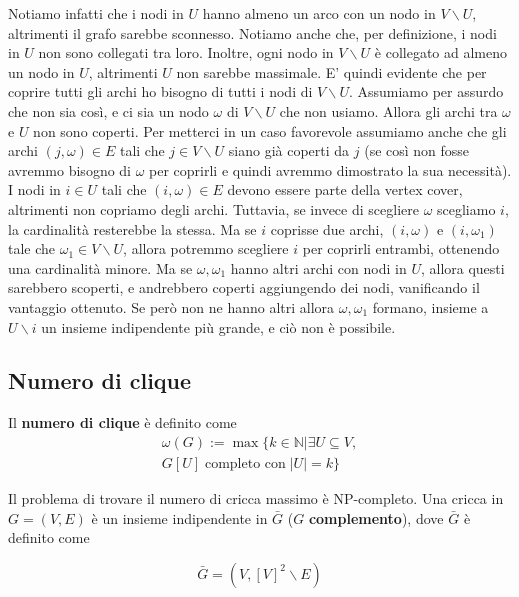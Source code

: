 \documentclass[12pt]{report}
\begin{document}
\noindent 
Notiamo infatti che i nodi in $U$ hanno almeno un arco con un nodo in $V\backslash U$, altrimenti il grafo sarebbe sconnesso. Notiamo anche che, per definizione, i nodi in $U$ non sono collegati tra loro. Inoltre, ogni nodo in $V\backslash U$ è collegato ad almeno un nodo in $U$, altrimenti $U$ non sarebbe massimale. E' quindi evidente che per coprire tutti gli archi ho bisogno  di tutti i nodi di $V\backslash U$. Assumiamo per assurdo che non sia così, e ci sia un nodo $\omega$ di $V \backslash U$ che non usiamo. Allora gli archi tra $\omega$ e $U$ non sono coperti. Per metterci in un caso favorevole assumiamo anche che gli archi $(j,\omega) \in E$ tali che $j \in V \backslash U $ siano già coperti da $j$ (se così non fosse avremmo bisogno di $\omega$ per coprirli e quindi avremmo dimostrato la sua necessità). I nodi in $i \in U$ tali che $(i,\omega) \in E$ devono essere parte della vertex cover, altrimenti non copriamo degli archi. Tuttavia, se invece di scegliere $\omega$ scegliamo $i$, la cardinalità resterebbe la stessa. Ma se $i$ coprisse due archi, $(i,\omega)$ e $(i,\omega_1)$ tale che $\omega_1 \in V \backslash U$, allora potremmo scegliere $i$ per coprirli entrambi, ottenendo una cardinalità minore. Ma se $\omega,\omega_1$ hanno altri archi con nodi in $U$, allora questi sarebbero scoperti, e andrebbero coperti aggiungendo dei nodi, vanificando il vantaggio ottenuto. Se però non ne hanno altri allora $\omega,\omega_1$ formano, insieme a $U \backslash i$ un insieme indipendente più grande, e ciò non è possibile.

\subsection{Numero di clique}

\begin{defi}
    Il \textbf{numero di clique} è definito come 
    \begin{multline*}
        \omega(G) := \max\{k \in \mathbb{N} | \exists U \subseteq V,\\ G[U] \; \text{completo con} \; |U| = k\}
    \end{multline*}
\end{defi}

\noindent 
Il problema di trovare il numero di cricca massimo è NP-completo. Una cricca in $G =(V,E)$ è un insieme indipendente in $\bar G$ ($G$ \textbf{complemento}), dove $\bar G$ è definito come 

$$\bar G = (V , [V]^2 \backslash E)$$
\end{document}
